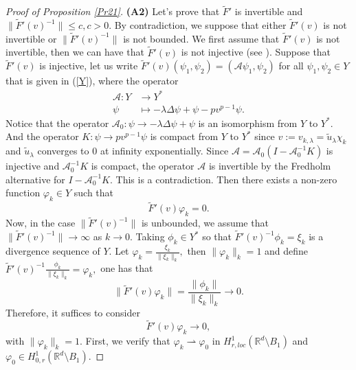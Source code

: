 \documentclass[reqno]{amsart}
\numberwithin{equation}{section}
\newenvironment{key words}{\textbf{Keywords}\mbox{  }}{ }
\begin{document}
\begin{proof}[Proof of Proposition \ref{Pr21}]
\textbf{(A2)} Let's prove that $\tilde{F}'$ is invertible and $\|\tilde{F}'(v)^{-1}\|\leq c,c>0.$  By contradiction, we suppose that either $\tilde{F}'(v)$ is not invertible or $\|\tilde{F}'(v)^{-1}\|$ is not bounded. We first assume that $\tilde{F}'(v)$ is not invertible, then we can have that $\tilde{F}'(v)$ is not injective (see \cite[Lemma 4.1]{AEKS14}).
Suppose that $\tilde{F}'(v)$ is injective, let us write $\tilde{F}'(v)(\psi_{1},\psi_{2})=(\mathcal{A}\psi_{1},\psi_{2})$ for all $\psi_{1},\psi_{2}\in Y$ that is given in (\ref{Y}), where the operator
\begin{align*}
  \mathcal{A}:Y &\rightarrow Y^{*} \\
  \psi&\mapsto-\lambda\Delta\psi+\psi-pv^{p-1}\psi.
\end{align*}
Notice that the operator $\mathcal{A}_{0}:\psi\rightarrow-\lambda\Delta\psi+\psi$ is an isomorphism from $Y$ to $Y^{*}.$ And the operator $K:\psi\rightarrow pv^{p-1}\psi$ is compact from $Y$ to $Y^{*}$ since $v:=v_{k,\lambda}=\tilde{u}_\lambda\chi_{k}$ and $\tilde{u}_\lambda$ converges to $0$ at infinity exponentially. Since $\mathcal{A}=\mathcal{A}_{0}(I-\mathcal{A}^{-1}_{0}K)$ is injective and $\mathcal{A}^{-1}_{0}K$ is compact, the operator $\mathcal{A}$ is invertible by the Fredholm alternative for $I-\mathcal{A}^{-1}_{0}K$. This is a contradiction. Then there exists a non-zero function $\varphi_{k}\in Y$ such that
$$\tilde{F}'(v)\varphi_{k}=0.$$
Now, in the case $\|\tilde{F}'(v)^{-1}\|$ is unbounded, we assume that $\|\tilde{F}'(v)^{-1}\|\rightarrow\infty$ as $k \to 0$. Taking $\phi_k\in Y^{*}$ so that $\tilde{F}'(v)^{-1}\phi_k=\xi_{k}$ is a divergence sequence of $Y.$ Let $\varphi_{k}=\frac{\xi_{k}}{\|\xi_{k}\|_{k}},$ then $\|\varphi_{k}\|_{k}=1$ and define $\tilde{F}'(v)^{-1}\frac{\phi_k}{\|\xi_{k}\|_{k}}=\varphi_{k},$ one has that
$$\|\tilde{F}'(v)\varphi_{k}\|=\frac{\|\phi_k\|}{\|\xi_{k}\|_k}\rightarrow 0.$$
Therefore, it suffices to consider
$$\tilde{F}'(v)\varphi_{k}\rightarrow 0,$$
with $\|\varphi_{k}\|_k=1.$ First, we verify that $\varphi_{k}\rightharpoonup\varphi_{0}$ in $H_{r,loc}^{1}(\mathbb{R}^{d}\setminus B_{1})$ and $\varphi_{0}\in H_{0,r}^{1}(\mathbb{R}^{d}\setminus B_{1})$.


\end{proof}
\end{document}
